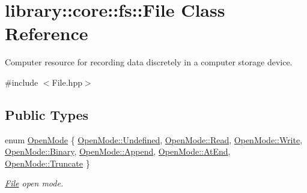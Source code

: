 \hypertarget{classlibrary_1_1core_1_1fs_1_1_file}{}\section{library\+::core\+::fs\+::File Class Reference}
\label{classlibrary_1_1core_1_1fs_1_1_file}


Computer resource for recording data discretely in a computer storage device.  




{\ttfamily \#include $<$File.\+hpp$>$}

\subsection*{Public Types}
\begin{DoxyCompactItemize}
\item 
enum \mbox{\hyperlink{classlibrary_1_1core_1_1fs_1_1_file_ac18b7d7ee50c803cbd0087b0f71ce4f7}{Open\+Mode}} \{ \newline
\mbox{\hyperlink{classlibrary_1_1core_1_1fs_1_1_file_ac18b7d7ee50c803cbd0087b0f71ce4f7aec0fc0100c4fc1ce4eea230c3dc10360}{Open\+Mode\+::\+Undefined}}, 
\mbox{\hyperlink{classlibrary_1_1core_1_1fs_1_1_file_ac18b7d7ee50c803cbd0087b0f71ce4f7a7a1a5f3e79fdc91edf2f5ead9d66abb4}{Open\+Mode\+::\+Read}}, 
\mbox{\hyperlink{classlibrary_1_1core_1_1fs_1_1_file_ac18b7d7ee50c803cbd0087b0f71ce4f7a1129c0e4d43f2d121652a7302712cff6}{Open\+Mode\+::\+Write}}, 
\mbox{\hyperlink{classlibrary_1_1core_1_1fs_1_1_file_ac18b7d7ee50c803cbd0087b0f71ce4f7a6ce976e8f061b2b5cfe4d0c50c3405dd}{Open\+Mode\+::\+Binary}}, 
\newline
\mbox{\hyperlink{classlibrary_1_1core_1_1fs_1_1_file_ac18b7d7ee50c803cbd0087b0f71ce4f7a3ac4692f3935a49a0b243eecf529faa9}{Open\+Mode\+::\+Append}}, 
\mbox{\hyperlink{classlibrary_1_1core_1_1fs_1_1_file_ac18b7d7ee50c803cbd0087b0f71ce4f7a8d04b2d09dcc744cf134542097642db5}{Open\+Mode\+::\+At\+End}}, 
\mbox{\hyperlink{classlibrary_1_1core_1_1fs_1_1_file_ac18b7d7ee50c803cbd0087b0f71ce4f7aa8156810bfee2bd2b44765b9e91db3bd}{Open\+Mode\+::\+Truncate}}
 \}
\begin{DoxyCompactList}\small\item\em \mbox{\hyperlink{classlibrary_1_1core_1_1fs_1_1_file}{File}} open mode. \end{DoxyCompactList}\end{DoxyCompactItemize}
